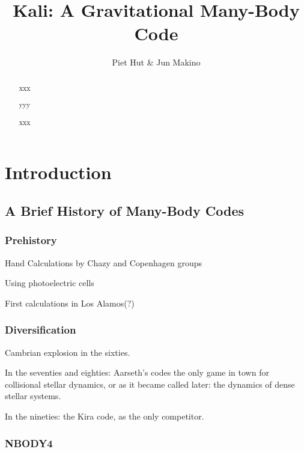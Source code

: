 \documentclass{article}[12pt]
\def\filler{xxxx xxxx xxxx xxxx xxxx xxxx xxxx xxxx xxxx xxxx xxxx xxxx
xxxx xxxx xxxx xxxx xxxx xxxx xxxx xxxx xxxx xxxx xxxx xxxx
xxxx xxxx xxxx xxxx xxxx xxxx xxxx xxxx xxxx xxxx xxxx xxxx
xxxx xxxx xxxx xxxx xxxx xxxx xxxx xxxx xxxx xxxx xxxx xxxx
xxxx xxxx xxxx xxxx xxxx xxxx xxxx xxxx xxxx xxxx xxxx xxxx
xxxx xxxx xxxx xxxx xxxx xxxx xxxx xxxx xxxx xxxx xxxx xxxx
xxxx xxxx xxxx xxxx xxxx xxxx xxxx xxxx xxxx xxxx xxxx xxxx
xxxx xxxx xxxx xxxx xxxx xxxx xxxx xxxx xxxx xxxx xxxx xxxx}
\def\filler{}
\begin{document}
\title{Kali: A Gravitational Many-Body Code}

\author{Piet Hut \& Jun Makino}

\maketitle

\begin{abstract}

xxx

yyy

xxx

\end{abstract}

\newpage

\tableofcontents

\newpage

\section{Introduction}

\filler

\subsection{A Brief History of Many-Body Codes}

\filler

\subsubsection{Prehistory}

Hand Calculations by Chazy and Copenhagen groups

Using photoelectric cells

First calculations in Los Alamos(?)

\subsubsection{Diversification}

Cambrian explosion in the sixties.

In the seventies and eighties: Aarseth's codes the only game in town
for collisional stellar dynamics, or as it became called later: the
dynamics of dense stellar systems.

In the nineties: the Kira code, as the only competitor.

\subsubsection{NBODY4}
\end{document}
